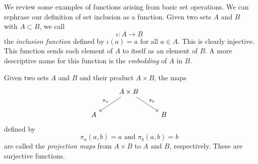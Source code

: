 \begin{sectionthm}
    We review some examples of functions arising from basic set operations. We can rephrase our definition of set inclusion as a function. Given two sets \(A\) and \(B\) with \(A \subset B\), we call
    \[
        \iota: A \to B
    \]
    the \emph{inclusion function} defined by \(\iota(a) = a\) for all \(a \in A\). This is clearly injective. This function sends each element of \(A\) to itself as an element of \(B\). A more descriptive name for this function is the \emph{embedding} of \(A\) in \(B\).

    Given two sets \(A\) and \(B\) and their product \(A \times B\), the maps
    \[
        \begin{tikzcd}
            & A\times B \arrow[ld, "\pi_a"'] \arrow[rd, "\pi_b"] &   \\
          A &                                                    & B
          \end{tikzcd}
    \]
    defined by
    \[
        \pi_a(a, b) = a \text{ and } \pi_b(a, b) = b
    \]
    are called the \emph{projection maps} from \(A \times B\) to \(A\) and \(B\), respectively. These are surjective functions.
\end{sectionthm}
